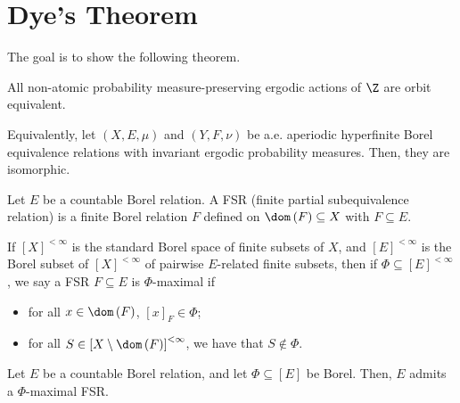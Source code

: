\documentclass[10pt]{mypackage}
\begin{document}
\section{Dye's Theorem}%
The goal is to show the following theorem.
\begin{theorem}
  All non-atomic probability measure-preserving ergodic actions of $\Z$ are orbit equivalent.
\end{theorem}
Equivalently, let $\left( X,E,\mu \right)$ and $\left( Y,F,\nu \right)$ be a.e. aperiodic hyperfinite Borel equivalence relations with invariant ergodic probability measures. Then, they are isomorphic.
\begin{definition}
  Let $E$ be a countable Borel relation. A FSR (finite partial subequivalence relation) is a finite Borel relation $F$ defined on $\dom\left( F \right)\subseteq X$ with $F\subseteq E$.

  If $\left[ X \right]^{<\infty}$ is the standard Borel space of finite subsets of $X$, and $\left[ E \right]^{<\infty}$ is the Borel subset of $\left[ X \right]^{<\infty}$ of pairwise $E$-related finite subsets, then if $\Phi\subseteq \left[ E \right]^{<\infty}$, we say a FSR $F\subseteq E$ is $\Phi$-maximal if
  \begin{itemize}
    \item for all $x\in \dom\left( F \right)$, $\left[ x \right]_F\in \Phi$;
    \item for all $S\in \left[ X\setminus \dom\left( F \right) \right]^{<\infty}$, we have that $S\notin \Phi$.
  \end{itemize}
\end{definition}
\begin{lemma}
  Let $E$ be a countable Borel relation, and let $\Phi\subseteq \left[ E \right]$ be Borel. Then, $E$ admits a $\Phi$-maximal FSR.
\end{lemma}
\end{document}
